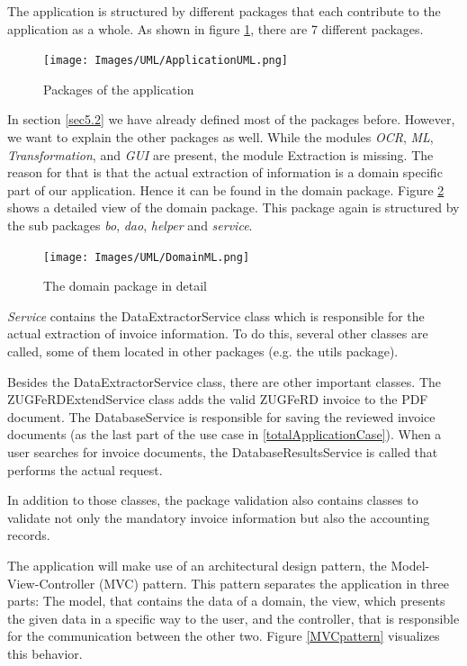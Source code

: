 The application is structured by different packages that each contribute to the application as a whole.
As shown in figure \ref{applicationUML}, there are 7 different packages. 

\begin{figure}[ht!]
\centering
\texttt{[image: Images/UML/ApplicationUML.png]}
\caption{Packages of the application \label{applicationUML}}
\end{figure}

In section \ref{sec5.2} we have already defined most of the packages before. However, we want to explain the other packages as well. While the modules \emph{OCR}, \emph{ML}, \emph{Transformation}, and \emph{GUI} are present, the module Extraction is missing. The reason for that is that the actual extraction of information is a domain specific part of our application. Hence it can be found in the domain package. Figure \ref{domainUML} shows a detailed view of the domain package. This package again is structured by the sub packages \emph{bo}, \emph{dao}, \emph{helper} and \emph{service}.

\begin{figure}[ht!]
\centering
%
\texttt{[image: Images/UML/DomainML.png]}
\caption{The domain package in detail \label{domainUML}}
\end{figure}

\emph{Service} contains the DataExtractorService class which is responsible for the actual extraction of invoice information. To do this, several other classes are called, some of them located in other packages (e.g. the utils package).

Besides the DataExtractorService class, there are other important classes. The ZUGFeRDExtendService class adds the valid ZUGFeRD invoice to the PDF document. The DatabaseService is responsible for saving the reviewed invoice documents (as the last part of the use case in \ref{totalApplicationCase}). When a user searches for invoice documents, the DatabaseResultsService is called that performs the actual request.

In addition to those classes, the package validation also contains classes to validate not only the mandatory invoice information but also the accounting records.

The application will make use of an architectural design pattern, the Model-View-Controller (MVC) pattern.
This pattern separates the application in three parts: The model, that contains the data of a domain, the view, which presents the given data in a specific way to the user, and the controller, that is responsible for the communication between the other two. Figure \ref{MVCpattern} visualizes this behavior.

